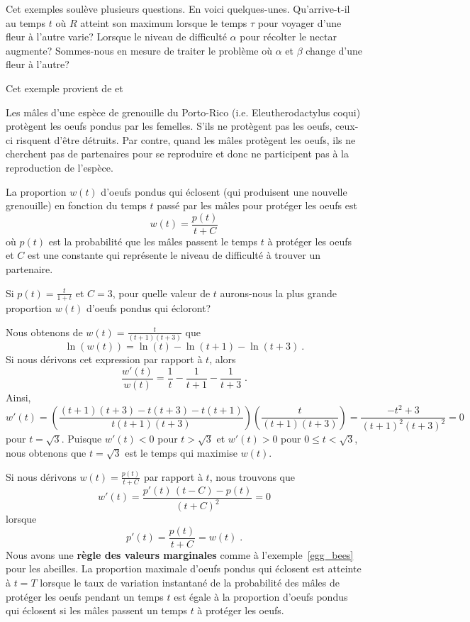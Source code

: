 {\begin{egg}[\life]
Cet exemples soulève plusieurs questions.  En voici quelques-unes.
Qu'arrive-t-il au temps $t$ où $R$ atteint son maximum lorsque le
temps $\tau$ pour voyager d'une fleur à l'autre varie?  Lorsque le
niveau de difficulté $\alpha$ pour récolter le nectar augmente?
Sommes-nous en mesure de traiter le problème où $\alpha$ et $\beta$
change d'une fleur à l'autre?
\label{egg_bees}
\end{egg}

\begin{egg}[\life]
Cet exemple provient de \cite{NH} et \cite{R}

Les mâles d'une espèce de grenouille du Porto-Rico
(i.e. Eleutherodactylus coqui) protè\-gent les oeufs pondus par les
femelles.  S'ils ne protègent pas les oeufs, ceux-ci risquent d'être
détruits.  Par contre, quand les mâles protègent les oeufs, ils ne
cherchent pas de partenaires pour se reproduire et donc ne participent
pas à la reproduction de l'espèce.

La proportion $w(t)$ d'oeufs pondus qui éclosent (qui produisent une
nouvelle grenouille) en fonction du temps $t$ passé par les mâles pour
protéger les oeufs est
\[
w(t) = \frac{p(t)}{t+C}
\]
où $p(t)$ est la probabilité que les mâles passent le temps $t$ à
protéger les oeufs et $C$ est une constante qui représente le niveau
de difficulté à trouver un partenaire.

Si $\displaystyle p(t) = \frac{t}{1+t}$ et $C=3$, pour quelle valeur
de $t$ aurons-nous la plus grande proportion $w(t)$ d'oeufs pondus qui
écloront?

Nous obtenons de $\displaystyle w(t) = \frac{t}{(t+1)(t+3)}$ que
\[
\ln(w(t)) = \ln(t) - \ln(t+1) - \ln(t+3) \ .
\]
Si nous dérivons cet expression par rapport à $t$, alors
\[
\frac{w'(t)}{w(t)} = \frac{1}{t} - \frac{1}{t+1} - \frac{1}{t+3} \; .
\]
Ainsi,
\[
w'(t) = \left(\frac{ (t+1)(t+3) - t(t+3)-t(t+1) }{t(t+1)(t+3)} \right)
\left(\frac{t}{(t+1)(t+3)}\right) = \frac{ -t^2 + 3}{(t+1)^2(t+3)^2} =0
\]
pour $t=\sqrt{3}$.  Puisque $w'(t)<0$ pour $t>\sqrt{3}$ et $w'(t)>0$
pour $0\leq t < \sqrt{3}$, nous obtenons que $t=\sqrt{3}$ est le temps
qui maximise $w(t)$.

Si nous dérivons $\displaystyle w(t) = \frac{p(t)}{t+C}$ par rapport à
$t$, nous trouvons que
\[
w'(t) = \frac{p'(t)\,(t-C) - p(t)}{(t+C)^2} = 0
\]
lorsque
\[
p'(t) = \frac{p(t)}{t+C} = w(t) \; .
\]
Nous avons une {\bfseries règle des valeurs marginales}
 comme à l'exemple~\ref{egg_bees}
pour les abeilles.  La proportion maximale d'oeufs pondus qui
éclosent est atteinte à $t=T$ lorsque le taux de variation instantané
de la probabilité des mâles de protéger les oeufs pendant un temps $t$
est égale à la proportion d'oeufs pondus qui éclosent si les mâles
passent un temps $t$ à protéger les oeufs.
\end{egg}

}
